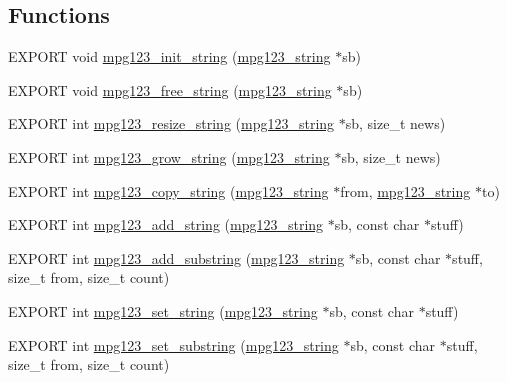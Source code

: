 \subsection*{Functions}
\begin{DoxyCompactItemize}
\item 
E\+X\+P\+O\+RT void \hyperlink{group__mpg123__metadata_ga4d9ddf9c9a074688d005873c22eade08}{mpg123\+\_\+init\+\_\+string} (\hyperlink{structmpg123__string}{mpg123\+\_\+string} $\ast$sb)
\item 
E\+X\+P\+O\+RT void \hyperlink{group__mpg123__metadata_gaed35b9810bfd1703a3196d13f58e6da1}{mpg123\+\_\+free\+\_\+string} (\hyperlink{structmpg123__string}{mpg123\+\_\+string} $\ast$sb)
\item 
E\+X\+P\+O\+RT int \hyperlink{group__mpg123__metadata_gafa0fa74b81fa70e24a8fd89e88e4fe77}{mpg123\+\_\+resize\+\_\+string} (\hyperlink{structmpg123__string}{mpg123\+\_\+string} $\ast$sb, size\+\_\+t news)
\item 
E\+X\+P\+O\+RT int \hyperlink{group__mpg123__metadata_gacba226b1faa6e697819fa72f645045dd}{mpg123\+\_\+grow\+\_\+string} (\hyperlink{structmpg123__string}{mpg123\+\_\+string} $\ast$sb, size\+\_\+t news)
\item 
E\+X\+P\+O\+RT int \hyperlink{group__mpg123__metadata_ga6f046f76f7ef3961cf6cb17c8d2a5a94}{mpg123\+\_\+copy\+\_\+string} (\hyperlink{structmpg123__string}{mpg123\+\_\+string} $\ast$from, \hyperlink{structmpg123__string}{mpg123\+\_\+string} $\ast$to)
\item 
E\+X\+P\+O\+RT int \hyperlink{group__mpg123__metadata_ga035a2cc74c3005ed369a42c377f64055}{mpg123\+\_\+add\+\_\+string} (\hyperlink{structmpg123__string}{mpg123\+\_\+string} $\ast$sb, const char $\ast$stuff)
\item 
E\+X\+P\+O\+RT int \hyperlink{group__mpg123__metadata_gac594f05797208607698ea7c3c6d1b6f3}{mpg123\+\_\+add\+\_\+substring} (\hyperlink{structmpg123__string}{mpg123\+\_\+string} $\ast$sb, const char $\ast$stuff, size\+\_\+t from, size\+\_\+t count)
\item 
E\+X\+P\+O\+RT int \hyperlink{group__mpg123__metadata_gaf1f4594c3c8dc6beead0448cf81edfa5}{mpg123\+\_\+set\+\_\+string} (\hyperlink{structmpg123__string}{mpg123\+\_\+string} $\ast$sb, const char $\ast$stuff)
\item 
E\+X\+P\+O\+RT int \hyperlink{group__mpg123__metadata_ga94df6ed2103e9ed084bc5c970e6178a9}{mpg123\+\_\+set\+\_\+substring} (\hyperlink{structmpg123__string}{mpg123\+\_\+string} $\ast$sb, const char $\ast$stuff, size\+\_\+t from, size\+\_\+t count)

\end{DoxyCompactItemize}
